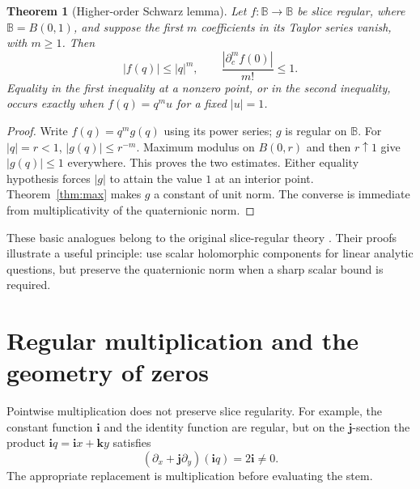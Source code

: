 \documentclass[11pt,a4paper]{article}
\numberwithin{equation}{section}
\newtheorem{theorem}{Theorem}[section]
\theoremstyle{definition}
\theoremstyle{remark}
\newcommand{\BB}{\mathbb B}
\newcommand{\ii}{\mathbf i}
\newcommand{\jj}{\mathbf j}
\newcommand{\kk}{\mathbf k}
\newcommand{\pc}{\partial_c}
\begin{document}
\begin{theorem}[Higher-order Schwarz lemma]
\label{thm:schwarz}
Let $f:\BB\to\BB$ be slice regular, where $\BB=B(0,1)$, and suppose the
first $m$ coefficients in its Taylor series vanish, with $m\ge1$.
Then
\begin{equation}
 |f(q)|\le |q|^m,\qquad \frac{|\pc^m f(0)|}{m!}\le1.
 \label{eq:schwarz}
\end{equation}
Equality in the first inequality at a nonzero point, or in the second
inequality, occurs exactly when $f(q)=q^m u$ for a fixed $|u|=1$.
\end{theorem}
\begin{proof}
Write $f(q)=q^m g(q)$ using its power series; $g$ is regular on $\BB$.
For $|q|=r<1$, $|g(q)|\le r^{-m}$. Maximum modulus on $B(0,r)$ and then
$r\uparrow1$ give $|g(q)|\le1$ everywhere. This proves the two estimates.
Either equality hypothesis forces $|g|$ to attain the value $1$ at an interior
point. Theorem~\ref{thm:max} makes $g$ a constant of unit norm. The converse
is immediate from multiplicativity of the quaternionic norm.
\end{proof}
These basic analogues belong to the original slice-regular theory
\cite{GS}. Their proofs illustrate a useful principle: use scalar holomorphic
components for linear analytic questions, but preserve the quaternionic norm
when a sharp scalar bound is required.

\section{Regular multiplication and the geometry of zeros}
\label{sec:algebra}
Pointwise multiplication does not preserve slice regularity. For example, the
constant function $\ii$ and the identity function are regular, but on the
$\jj$-section the product $\ii q=\ii x+\kk y$ satisfies
\[
 (\partial_x+\jj\partial_y)(\ii q)=2\ii\ne0.
\]
The appropriate replacement is multiplication before evaluating the stem.
\end{document}
